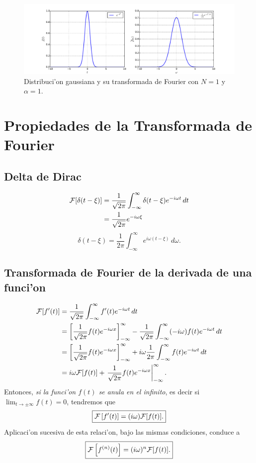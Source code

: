 \begin{figure}[h]
\centering
\includegraphics[scale=0.4]{figs/fig-Fourier-Gaussiana.pdf}
\caption{Distribuci'on gaussiana y su transformada de Fourier con $N=1$ y $\alpha=1$.}
\label{im:gaussiana}
\end{figure}
%
\section{Propiedades de la Transformada de Fourier} 
\subsection{Delta de Dirac}
\begin{align}
{\cal F}[\delta(t-\xi)] 
 &=\frac{1}{\sqrt{2\pi}}\int_{-\infty}^\infty\delta(t-\xi) e^{-i\omega t}\,dt 
\\
 &=\frac{1}{\sqrt{2\pi}} e^{-i\omega\xi}
\end{align}
\begin{equation}
\boxed{ 
\delta(t-\xi) =\frac{1}{2\pi}\int_{-\infty}^\infty e^{i\omega (t-\xi)}\,d\omega. 
 }
\end{equation}
%
\subsection{Transformada de Fourier de la derivada de una funci'on}
\begin{align}
{\cal F}[f'(t)]
 &=\frac{1}{\sqrt{2\pi}}\int_{-\infty}^\infty f'(t) e^{-i\omega t}\,dt \\
 &=\left[\frac{1}{\sqrt{2\pi}} f(t) e^{-i\omega x}\right]_{-\infty}^\infty
 -\frac{1}{\sqrt{2\pi}}\int_{-\infty}^\infty (-i\omega) f(t) e^{-i\omega t}\,dt \\
 &=\left[\frac{1}{\sqrt{2\pi}} f(t) e^{-i\omega x}\right]_{-\infty}^\infty+ i\omega\frac{1}{2\pi}\int_{-\infty}^\infty f(t) e^{-i\omega t}\,dt \\
 &= i\omega{\cal F}[f(t)]+\left.\frac{1}{\sqrt{2\pi}} f(t) e^{-i\omega x}\right|_{-\infty}^\infty.\label{eq:trans-fourier-derivada-gen}
\end{align}
Entonces, \textit{si la funci'on $f(t)$ se anula en el infinito}, es decir si $\lim_{t\to\pm\infty}f(t)=0$, tendremos que
\begin{equation}
\boxed{ 
{\cal F}\left[f'(t)\right] = (i\omega){\cal F}[f(t)]. \label{eq:trans-fourier-derivada-esp}
 } 
\end{equation} 
Aplicaci'on sucesiva de esta relaci'on, bajo las mismas condiciones, conduce a
\begin{equation}
\boxed{ 
{\cal F}\left[f^{(n)}(t)\right] = (i\omega)^n{\cal F}[f(t)]. 
 } 
\end{equation} 
%
